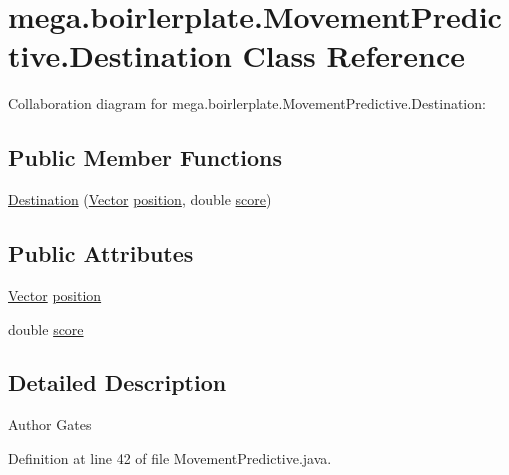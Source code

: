 \hypertarget{classmega_1_1boirlerplate_1_1_movement_predictive_1_1_destination}{}\section{mega.\+boirlerplate.\+Movement\+Predictive.\+Destination Class Reference}
\label{classmega_1_1boirlerplate_1_1_movement_predictive_1_1_destination}


Collaboration diagram for mega.\+boirlerplate.\+Movement\+Predictive.\+Destination\+:
\subsection*{Public Member Functions}
\begin{DoxyCompactItemize}
\item 
\hyperlink{classmega_1_1boirlerplate_1_1_movement_predictive_1_1_destination_a348e1541283d5b85f8e0c4c41ae35367}{Destination} (\hyperlink{classmega_1_1boirlerplate_1_1_vector}{Vector} \hyperlink{classmega_1_1boirlerplate_1_1_movement_predictive_1_1_destination_a7349cbc36f193013f472a4856eaab3a6}{position}, double \hyperlink{classmega_1_1boirlerplate_1_1_movement_predictive_1_1_destination_a50a8627ed59861e176005fd1b7897ac0}{score})
\end{DoxyCompactItemize}
\subsection*{Public Attributes}
\begin{DoxyCompactItemize}
\item 
\hyperlink{classmega_1_1boirlerplate_1_1_vector}{Vector} \hyperlink{classmega_1_1boirlerplate_1_1_movement_predictive_1_1_destination_a7349cbc36f193013f472a4856eaab3a6}{position}
\item 
double \hyperlink{classmega_1_1boirlerplate_1_1_movement_predictive_1_1_destination_a50a8627ed59861e176005fd1b7897ac0}{score}
\end{DoxyCompactItemize}


\subsection{Detailed Description}
\begin{DoxyAuthor}{Author}
Gates 
\end{DoxyAuthor}


Definition at line 42 of file Movement\+Predictive.\+java.



